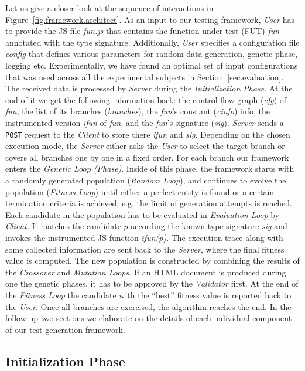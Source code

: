 \documentclass[sigconf]{acmart}
\newcommand{\Server}{\emph{Server}\xspace}
\newcommand{\Client}{\emph{Client}\xspace}
\newcommand{\User}{\emph{User}\xspace}
\newcommand{\Validator}{\emph{Validator}\xspace}
\begin{document}
Let us give a closer look at the sequence of interactions in Figure~\ref{fig.framework.architect}. As an input to our testing framework, \User has to provide the JS file \emph{fun.js} that contains the function under test (FUT) \emph{fun} annotated with the type signature. Additionally, \User specifies a configuration file \emph{config} that defines various parameters for random data generation, genetic phase, logging etc. Experimentally, we have found an optimal set of input configurations that was used across all the experimental subjects in Section~\ref{sec.evaluation}. The received data is processed by \Server during the \emph{Initialization Phase}. At the end of it we get the following information back: the control flow graph (\emph{cfg}) of \emph{fun}, the list of its branches (\emph{branches}), the \emph{fun}'s  constant (\emph{cinfo}) info, the instrumented version \emph{ifun} of \emph{fun}, and the \emph{fun}'s signature (\emph{sig}). \Server sends a \texttt{POST} request to the \Client to store there \emph{ifun} and \emph{sig}. Depending on the chosen execution mode, the \Server either asks the \User to select the target branch or covers all branches one by one in a fixed order. For each branch our framework enters the \emph{Genetic Loop (Phase)}. Inside of this phase, the framework starts with a randomly generated population (\emph{Random Loop}), and continues to evolve the population (\emph{Fitness Loop}) until either a perfect entity is found or a certain termination criteria is achieved, e.g. the limit of generation attempts is reached. Each candidate in the population has to be evaluated in \emph{Evaluation Loop} by \Client. It matches the candidate $p$ according the known type signature \emph{sig} and invokes the instrumented JS function \emph{ifun(p)}. The execution trace along with some collected information are sent back to the \Server, where the final fitness value is computed. The new population is constructed by combining the results of the \emph{Crossover} and \emph{Mutation Loops}. If an HTML document is produced during one the genetic phases, it has to be approved by the \Validator first. At the end of the \emph{Fitness Loop} the candidate with the ``best'' fitness value is reported back to the \User. Once all branches are exercised, the algorithm reaches the end. In the follow up two sections we elaborate on the details of each individual component of our test generation framework.

\subsection{Initialization Phase}
\label{sub.sec.init.phase}
\end{document}
